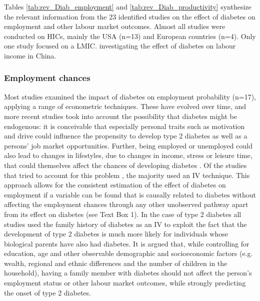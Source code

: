 Tables \ref{tab:rev_Diab_employment} and \ref{tab:rev_Diab_productivity} synthesize the relevant information from the 23 identified studies on the effect of diabetes on employment and other labour market outcomes. Almost all studies were conducted on \acp{HIC}, mainly the USA (n=13) and European countries (n=4). Only one study focused on a \ac{LMIC}. investigating the effect of diabetes on labour income in China.

\subsubsection*{Employment chances}
Most studies examined the impact of diabetes on employment probability (n=17), applying a range of econometric techniques. These have evolved over time, and more recent studies took into account the possibility that diabetes might be endogenous: it is conceivable that especially personal traits such as motivation and drive could influence the propensity to develop type 2 diabetes as well as a persons' job market opportunities. Further, being employed or unemployed could also lead to changes in lifestyles, due to changes in income, stress or leisure time, that could themselves affect the chances of developing diabetes \parencite{Brown2005}. Of the studies that tried to account for this problem \parencite{Brown2005,Minor2011,Latif2009,Lin2011b,Zhang2009,Harris2009}, the majority used an \ac{IV} technique. This approach allows for the consistent estimation of the effect of diabetes on employment if a variable can be found that is causally related to diabetes without affecting the employment chances through any other unobserved pathway apart from its effect on diabetes (see Text Box 1). In the case of type 2 diabetes all studies used the family history of diabetes as an \ac{IV} to exploit the fact that the development of type 2 diabetes is much more likely for individuals whose biological parents have also had diabetes. It is argued that, while controlling for education, age and other observable demographic and socioeconomic factors (e.g. wealth, regional and ethnic differences and the number of children in the household), having a family member with diabetes should not affect the person's employment status or other labour market outcomes, while strongly predicting the onset of type 2 diabetes. 

